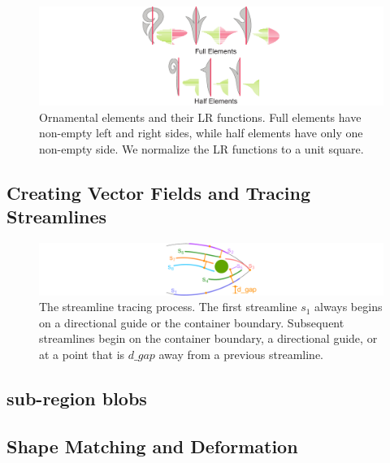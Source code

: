 \begin{figure}
\centering
\includegraphics[width=1.0\textwidth]{figures/flowpak/ornaments.pdf}
\caption{\label{ornamental_shapes_fig}
Ornamental elements and their LR functions. Full elements have non-empty
left and right sides, while half elements have only one non-empty side. 
We normalize the LR functions to a unit square.}
\end{figure}

\subsection{Creating Vector Fields and Tracing Streamlines}

\begin{figure}
\centering
\includegraphics[width=1.0\textwidth]{figures/flowpak/streamline_tracing.pdf}
\caption{\label{streamline_tracing}
The streamline tracing process. The first streamline $s_1$ always begins
on a directional guide or the container boundary.  Subsequent streamlines begin
on the container boundary, a directional guide, or at a point that is 
$d\_gap$ away from a previous streamline.}
\end{figure}

\subsection{sub-region blobs}


\subsection{Shape Matching and Deformation}

